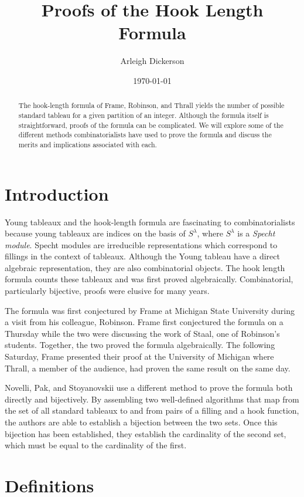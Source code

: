 \documentclass[11pt]{article}
\title{Proofs of the Hook Length Formula}
\author{Arleigh Dickerson}
\date{\today}
\theoremstyle{definition}
\begin{document}
\maketitle

\begin{abstract}
The hook-length formula of Frame, Robinson, and Thrall yields the number of possible standard tableau for a given partition of an integer. Although the formula itself is straightforward, proofs of the formula can be complicated. We will explore some of the different methods combinatorialists have used to prove the formula and discuss the merits and implications associated with each. 
\end{abstract}

\section{Introduction}
Young tableaux and the hook-length formula are fascinating to combinatorialists because young tableaux are indices on the basis of $S^\lambda$, where $S^\lambda$ is a \emph{Specht module}. Specht modules are irreducible representations which correspond to fillings in the context of tableaux. Although the Young tableau have a direct algebraic representation, they are also combinatorial objects. The hook length formula counts these tableaux and was first proved algebraically. Combinatorial, particularly bijective, proofs were elusive for many years.

The formula was first conjectured by Frame\cite{Frame} at Michigan State University during a visit from his colleague, Robinson. Frame first conjectured the formula on a Thursday while the two were discussing the work of Staal, one of Robinson's students. Together, the two proved the formula algebraically. The following Saturday, Frame presented their proof at the University of Michigan where Thrall, a member of the audience, had proven the same result on the same day.

Novelli, Pak, and Stoyanovskii\cite{NPS} use a different method to prove the formula both directly and bijectively. By assembling two well-defined algorithms that map from the set of all standard tableaux to and from pairs of a filling and a hook function, the authors are able to establish a bijection between the two sets. Once this bijection has been established, they establish the cardinality of the second set, which must be equal to the cardinality of the first.

\section{Definitions}
\end{document}
